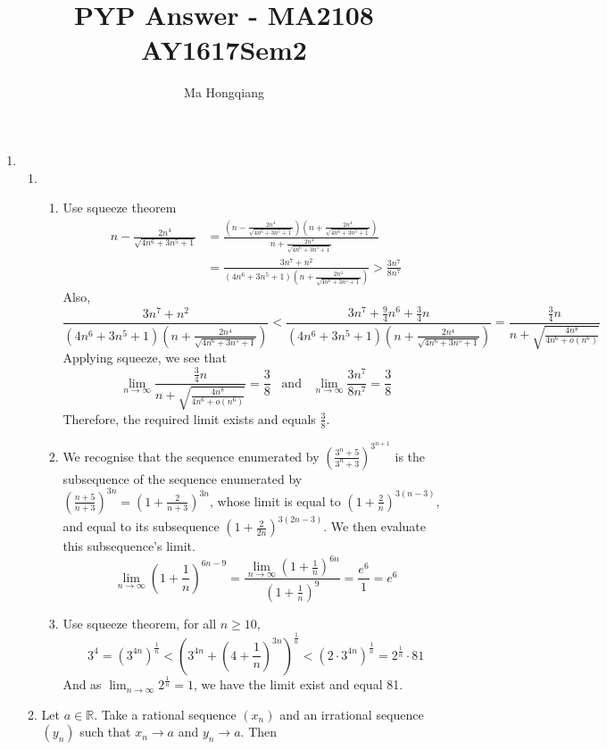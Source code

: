 \documentclass[12pt]{article}
\theoremstyle{definition}
\begin{document}
\title{PYP Answer - MA2108 AY1617Sem2}
\author{Ma Hongqiang}
\maketitle
\begin{enumerate}
  \item \begin{enumerate}%
    \item\begin{enumerate}%
      \item Use squeeze theorem
      \begin{align*}
n-\frac{2n^4}{\sqrt{4n^6+3n^5+1}}&=\frac{\left(n-\frac{2n^4}{\sqrt{4n^6+3n^5+1}}\right)\left(n+\frac{2n^4}{\sqrt{4n^6+3n^5+1}}\right)}{n+\frac{2n^4}{\sqrt{4n^6+3n^5+1}}}\\
&=\frac{3n^7+n^2}{(4n^6+3n^5+1)\left(n+\frac{2n^4}{\sqrt{4n^6+3n^5+1}}\right)}>\frac{3n^7}{8n^7}
      \end{align*}
      Also, 
      \[
\frac{3n^7+n^2}{(4n^6+3n^5+1)\left(n+\frac{2n^4}{\sqrt{4n^6+3n^5+1}}\right)}<\frac{3n^7+\frac{9}{4}n^6+\frac{3}{4}n}{(4n^6+3n^5+1)\left(n+\frac{2n^4}{\sqrt{4n^6+3n^5+1}}\right)}=\frac{\frac{3}{4}n}{n+\sqrt{\frac{4n^8}{4n^6+o(n^6)}}}
      \]
      Applying squeeze, we see that
      \[
\lim_{n\to\infty}\frac{\frac{3}{4}n}{n+\sqrt{\frac{4n^8}{4n^6+o(n^6)}}} = \frac{3}{8}\;\;\;\text{and}\;\;\;\lim_{n\to\infty}\frac{3n^7}{8n^7}=\frac{3}{8}
      \]
      Therefore, the required limit exists and equals $\frac{3}{8}$.
      \item We recognise that the sequence enumerated by $\left(\frac{3^n+5}{3^n+3}\right)^{3^{n+1}}$ is the subsequence of the sequence enumerated by $\left(\frac{n+5}{n+3}\right)^{3n}=\left(1+\frac{2}{n+3}\right)^{3n}$, whose limit is equal to $\left(1+\frac{2}{n}\right)^{3(n-3)}$, and equal to its subsequence $\left(1+\frac{2}{2n}\right)^{3(2n-3)}$. We then evaluate this subsequence's limit.
      \[
\lim_{n\to\infty}\left(1+\frac{1}{n}\right)^{6n-9}=\frac{\lim_{n\to\infty}\left(1+\frac{1}{n}\right)^{6n}}{\left(1+\frac{1}{n}\right)^9}=\frac{e^6}{1}=e^6
      \]
      \item Use squeeze theorem, for all $n\geq 10$,
    \[
3^4=(3^{4n})^\frac{1}{n}<\left(3^{4n}+\left(4+\frac{1}{n}\right)^{3n}\right)^{\frac{1}{n}}<(2\cdot 3^{4n})^\frac{1}{n}=2^\frac{1}{n}\cdot81
    \]
    And as $\lim_{n\to\infty} 2^\frac{1}{n}=1$, we have the limit exist and equal 81.
    \end{enumerate}
    \item Let $a\in\mathbb{R}$. Take a rational sequence $(x_n)$ and an irrational sequence $(y_n)$ such that $x_n\to a$ and $y_n\to a$. Then

\end{enumerate}
\end{enumerate}
\end{document}
